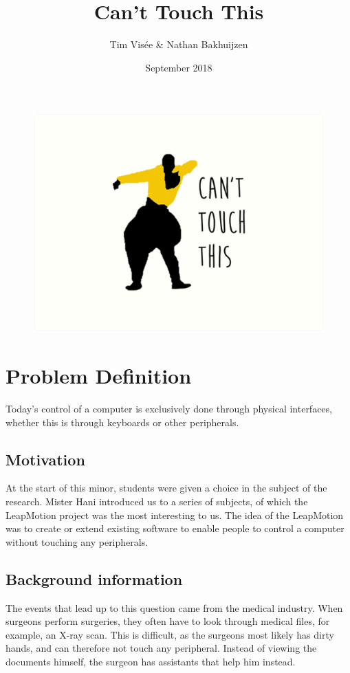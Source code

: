 \documentclass[a4paper]{article}
\title{Can't Touch This}
\author{Tim Visée \& Nathan Bakhuijzen}
\date{September 2018}
\begin{document}
  \maketitle
  \begin{figure}[h]
    \centering
    \includegraphics[width=\linewidth]{cant-touch-this}
  \end{figure}

  \clearpage

  \section{Problem Definition}
  Today's control of a computer is exclusively done through physical interfaces,
  whether this is through keyboards or other peripherals.

  \subsection{Motivation}
  At the start of this minor, students were given a choice in the subject of the
  research. Mister Hani introduced us to a series of subjects, of which the
  LeapMotion project was the most interesting to us. The idea of the LeapMotion
  was to create or extend existing software to enable people to control a
  computer without touching any peripherals.

  \subsection{Background information}
  The events that lead up to this question came from the medical industry. When
  surgeons perform surgeries, they often have to look through medical files, for
  example, an X-ray scan. This is difficult, as the surgeons most likely has
  dirty hands, and can therefore not touch any peripheral. Instead of viewing
  the documents himself, the surgeon has assistants that help him instead.
\end{document}
